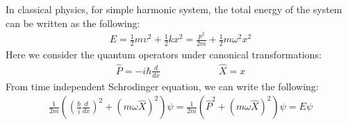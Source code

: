 \documentclass[11pt]{article}
\theoremstyle{break}
\theoremstyle{break}
\begin{document}
In classical physics, for simple harmonic system, the total energy of the system can be written as the following:
\begin{align*}
E = \frac{1}{2}mv^2 + \frac{1}{2}kx^2 = \frac{p^2}{2m}+\frac{1}{2}m\omega^2 x^2
\end{align*}
Here we consider the quantum operators under canonical transformations:
\begin{align*}
\hat{P} = -i\hbar \frac{d}{dx} \qquad\qquad\qquad \hat{X} = x
\end{align*}
From time independent Schrodinger equation, we can write the following:
\begin{align*}
\frac{1}{2m}\left( \left( \frac{\hbar}{i}\frac{d}{dx}\right)^2 + (m\omega \hat{X})^2 \right) \psi = \frac{1}{2m}\left( \hat{P}^2 + (m\omega \hat{X})^2 \right)\psi = E\psi
\end{align*}
\end{document}
